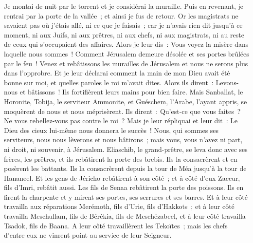\begin{multicols}{2}
Je montai de nuit par le torrent et je considérai la muraille. Puis en revenant, je rentrai par la porte de la vallée~; et ainsi je fus de retour.
Or les magistrats ne savaient pas où j'étais allé, ni ce que je faisais~; car je n'avais rien dit jusqu'à ce moment, ni aux Juifs, ni aux prêtres, ni aux chefs, ni aux magistrats, ni au reste de ceux qui s'occupaient des affaires.
Alors je leur dis~: Vous voyez la misère dans laquelle nous sommes~! Comment Jérusalem demeure désolée et ses portes brûlées par le feu~! Venez et rebâtissons les murailles de Jérusalem et nous ne serons plus dans l'opprobre.
Et je leur déclarai comment la main de mon Dieu avait été bonne sur moi, et quelles paroles le roi m'avait dites. Alors ils dirent~: Levons-nous et bâtissons~! Ils fortifièrent leurs mains pour bien faire.
Mais Sanballat, le Horonite, Tobija, le serviteur Ammonite, et Guéschem, l'Arabe, l'ayant appris, se moquèrent de nous et nous méprisèrent. Ils dirent~: Qu'est-ce que vous faites~? Ne vous rebellez-vous pas contre le roi~?
Mais je leur répliquai et leur dit~: Le Dieu des cieux lui-même nous donnera le succès~! Nous, qui sommes ses serviteurs, nous nous lèverons et nous bâtirons~; mais vous, vous n'avez ni part, ni droit, ni souvenir, à Jérusalem.
\VerseOne{}Eliaschib, le grand-prêtre, se leva donc avec ses frères, les prêtres, et ils rebâtirent la porte des brebis. Ils la consacrèrent et en posèrent les battants. Ils la consacrèrent depuis la tour de Méa jusqu'à la tour de Hananeel.
Et les gens de Jéricho rebâtirent à son côté~; et à côté d'eux Zaccur, fils d'Imri, rebâtit aussi.
Les fils de Senaa rebâtirent la porte des poissons. Ils en firent la charpente et y mirent ses portes, ses serrures et ses barres.
Et à leur côté travailla aux réparations Merémoth, fils d'Urie, fils d'Hakkots~; et à leur côté travailla Meschullam, fils de Bérékia, fils de Meschézabeel, et à leur côté travailla Tsadok, fils de Baana.
A leur côté travaillèrent les Tekoïtes~; mais les chefs d'entre eux ne vinrent point au service de leur Seigneur.

\end{multicols}
